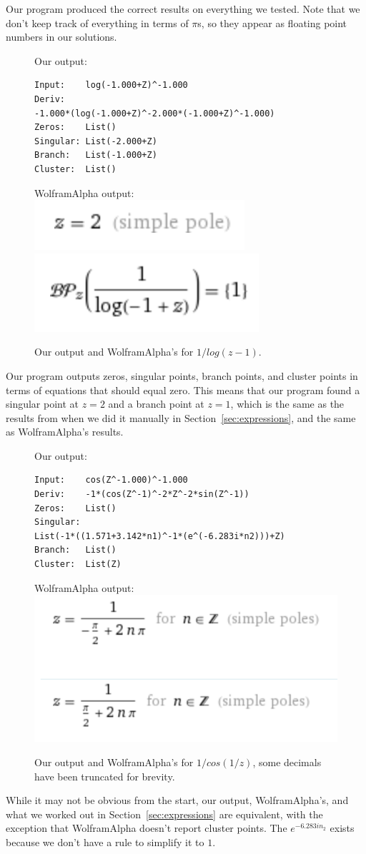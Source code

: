 Our program produced the correct results on everything we tested. Note that we don't keep track of everything in terms of $\pi$s, so they appear as floating point numbers in our solutions.

\begin{figure}[H]
	\raggedright
	Our output: \\
	\begin{verbatim}
Input:    log(-1.000+Z)^-1.000
Deriv:
-1.000*(log(-1.000+Z)^-2.000*(-1.000+Z)^-1.000)
Zeros:    List()
Singular: List(-2.000+Z)
Branch:   List(-1.000+Z)
Cluster:  List()
\end{verbatim} \vspace{7pt}
	WolframAlpha output:\\
	\includegraphics[width=0.4\columnwidth]{images/wpoles1}
	\includegraphics[width=0.4\columnwidth]{images/wbranch1}
	\caption{Our output and WolframAlpha's for $1/log(z-1)$.}
	\label{fig:singEx1}
\end{figure}
Our program outputs zeros, singular points, branch points, and cluster points in terms of equations that should equal zero. This means that our program found a singular point at $z=2$ and a branch point at $z=1$, which is the same as the results from when we did it manually in Section~\ref{sec:expressions}, and the same as WolframAlpha's results.

\begin{figure}[H]
	\raggedright
	Our output: \\
	\begin{verbatim}
Input:    cos(Z^-1.000)^-1.000
Deriv:    -1*(cos(Z^-1)^-2*Z^-2*sin(Z^-1))
Zeros:    List()
Singular:
List(-1*((1.571+3.142*n1)^-1*(e^(-6.283i*n2)))+Z)
Branch:   List()
Cluster:  List(Z)
	\end{verbatim} \vspace{7pt}
	WolframAlpha output:\\
	\includegraphics[width=0.6\columnwidth]{images/wpoles2}
	\caption{Our output and WolframAlpha's for $1/cos(1/z)$, some decimals have been truncated for brevity.}
	\label{fig:singEx2}
\end{figure}
While it may not be obvious from the start, our output, WolframAlpha's, and what we worked out in Section~\ref{sec:expressions} are equivalent, with the exception that WolframAlpha doesn't report cluster points. The $e^{-6.283in_2}$ exists because we don't have a rule to simplify it to $1$.

